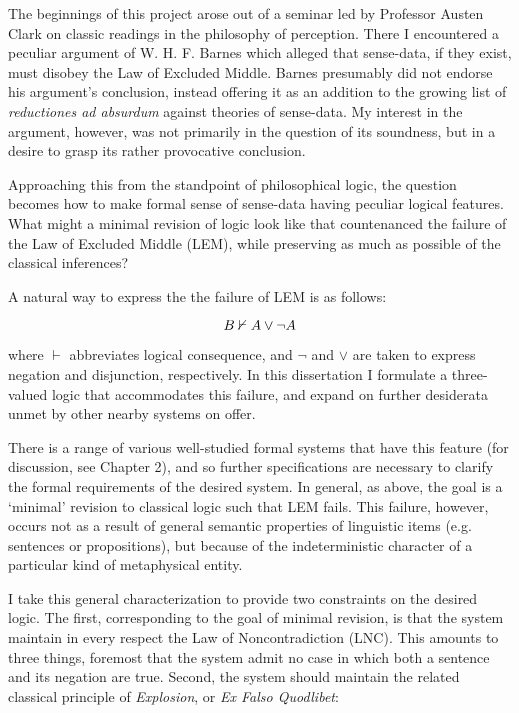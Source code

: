 
%


The beginnings of this project arose out of a seminar led by Professor Austen Clark on classic readings in the philosophy of perception. There I encountered a peculiar argument of W. H. F. Barnes \citeyear{Barnes:1944} which alleged that sense-data, if they exist, must disobey the Law of Excluded Middle. Barnes presumably did not endorse his argument's conclusion, instead offering it as an addition to the growing list of \emph{reductiones ad absurdum} against theories of sense-data. My interest in the argument, however, was not primarily in the question of its soundness, but in a desire to grasp its rather provocative conclusion.  

Approaching this from the standpoint of philosophical logic, the question becomes how to make formal sense of sense-data having peculiar logical features. What might a minimal revision of logic look like that countenanced the failure of the Law of Excluded Middle (LEM), while preserving as much as possible of the classical inferences? 

A natural way to express the the failure of LEM is as follows:

\[{B}\nvdash{A\vee\neg A}\]

\noindent where $\vdash$ abbreviates logical consequence, and $\neg$ and $\vee$ are taken to express negation and disjunction, respectively. In this dissertation I formulate a three-valued logic that accommodates this failure, and expand on further desiderata unmet by other nearby systems on offer. 

There is a range of various well-studied formal systems that have this feature (for discussion, see Chapter 2), and so further specifications are necessary to clarify the formal requirements of the desired system. In general, as above, the goal is a `minimal' revision to classical logic such that LEM fails. This failure, however, occurs not as a result of general semantic properties of linguistic items (e.g. sentences or propositions), but because of the indeterministic character of a particular kind of metaphysical entity. 

I take this general characterization to provide two constraints on the desired logic. The first, corresponding to the goal of minimal revision, is that the system maintain in every respect the Law of Noncontradiction (LNC). This amounts to three things, foremost that the system admit no case in which both a sentence and its negation are true. Second, the system should maintain the related classical principle of \emph{Explosion}, or \emph{Ex Falso Quodlibet}:

